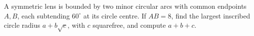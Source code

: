 A symmetric lens is bounded by two minor circular arcs with common endpoints $A,B$, each subtending $60^\circ$ at its circle centre. If $AB=8$, find the largest inscribed circle radius $a+b\sqrt c$, with $c$ squarefree, and compute $a+b+c$.
